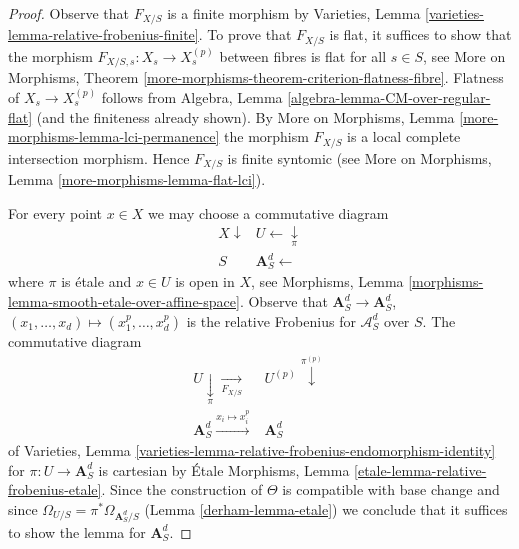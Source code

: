 \begin{proof}

Observe that $F_{X/S}$ is a finite morphism by
Varieties, Lemma \ref{varieties-lemma-relative-frobenius-finite}.
To prove that $F_{X/S}$ is flat, it suffices to show that
the morphism $F_{X/S, s} : X_s \to X^{(p)}_s$ between fibres
is flat for all $s \in S$, see More on Morphisms, Theorem
\ref{more-morphisms-theorem-criterion-flatness-fibre}.
Flatness of $X_s \to X^{(p)}_s$ follows from
Algebra, Lemma \ref{algebra-lemma-CM-over-regular-flat}
(and the finiteness already shown).
By More on Morphisms, Lemma
\ref{more-morphisms-lemma-lci-permanence}
the morphism $F_{X/S}$ is a local complete intersection morphism.
Hence $F_{X/S}$ is finite syntomic (see
More on Morphisms, Lemma \ref{more-morphisms-lemma-flat-lci}).

\medskip\noindent
For every point $x \in X$ we may choose a commutative diagram
$$
\begin{array}{cc}X \downarrow & U \longleftarrow\underset{\pi}{\downarrow} \\ S & \mathbf{A}^d_S \longleftarrow\end{array}
$$
where $\pi$ is \'etale and $x \in U$ is open in $X$, see
Morphisms, Lemma \ref{morphisms-lemma-smooth-etale-over-affine-space}.
Observe that
$\mathbf{A}^d_S \to \mathbf{A}^d_S$, $(x_1, \ldots, x_d) \mapsto
(x_1^p, \ldots, x_d^p)$ is the relative Frobenius for $\mathcal{A}^d_S$
over $S$. The commutative diagram
$$
\begin{array}{cc}U \underset{\pi}{\downarrow}\underset{F_{X/S}}{\longrightarrow} & U^{(p)} \overset{\pi^{(p)}}{\downarrow} \\ \mathbf{A}^d_S \overset{x_i \mapsto x_i^p}{\longrightarrow} & \mathbf{A}^d_S\end{array}
$$
of
Varieties, Lemma \ref{varieties-lemma-relative-frobenius-endomorphism-identity}
for $\pi : U \to \mathbf{A}^d_S$ is cartesian by
\'Etale Morphisms, Lemma
\ref{etale-lemma-relative-frobenius-etale}.
Since the construction of $\Theta$ is compatible with base change
and since $\Omega_{U/S} = \pi^*\Omega_{\mathbf{A}^d_S/S}$
(Lemma \ref{derham-lemma-etale})
we conclude that it suffices to show the lemma for
$\mathbf{A}^d_S$.


\end{proof}
